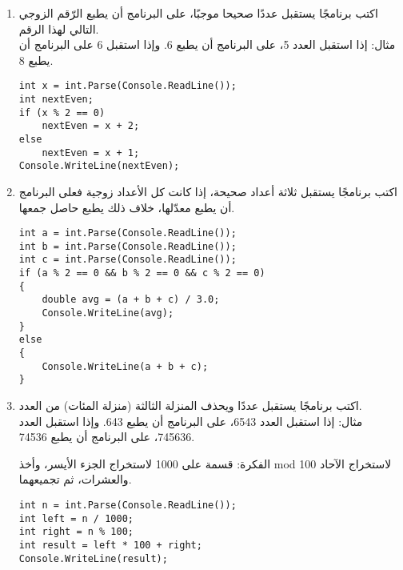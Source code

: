 \documentclass[12pt]{article}
\begin{document}
\begin{enumerate}[itemsep=2em]
\item
اكتب برنامجًا يستقبل عددًا صحيحا موجبًا، على البرنامج أن يطبع الرّقم الزوجي التالي لهذا الرقم.\\
مثال: إذا استقبل العدد 5، على البرنامج أن يطبع 6. وإذا استقبل 6 على البرنامج أن يطبع 8.

\ifwithsols
\begin{boxSolution}
\begin{english}
\begin{verbatim}
int x = int.Parse(Console.ReadLine());
int nextEven;
if (x % 2 == 0)
    nextEven = x + 2;
else
    nextEven = x + 1;
Console.WriteLine(nextEven);
\end{verbatim}
\end{english}
\end{boxSolution}
\fi


\item
اكتب برنامجًا يستقبل ثلاثة أعداد صحيحة، إذا كانت كل الأعداد زوجية فعلى البرنامج أن يطبع معدّلها، خلاف ذلك يطبع حاصل جمعها.

\ifwithsols
\begin{boxSolution}
\begin{english}
\begin{verbatim}
int a = int.Parse(Console.ReadLine());
int b = int.Parse(Console.ReadLine());
int c = int.Parse(Console.ReadLine());
if (a % 2 == 0 && b % 2 == 0 && c % 2 == 0)
{
    double avg = (a + b + c) / 3.0;
    Console.WriteLine(avg);
}
else
{
    Console.WriteLine(a + b + c);
}
\end{verbatim}
\end{english}
\end{boxSolution}
\fi


\item
اكتب برنامجًا يستقبل عددًا ويحذف المنزلة الثالثة (منزلة المئات) من العدد.\\
مثال: إذا استقبل العدد 6543، على البرنامج أن يطبع 643. وإذا استقبل العدد 745636، على البرنامج أن يطبع 74536.

\ifwithsols
\begin{boxSolution}
الفكرة: قسمة على 1000 لاستخراج الجزء الأيسر، وأخذ \textenglish{mod 100} لاستخراج الآحاد والعشرات، ثم تجميعهما.
\begin{english}
\begin{verbatim}
int n = int.Parse(Console.ReadLine());
int left = n / 1000;
int right = n % 100;
int result = left * 100 + right;
Console.WriteLine(result);
\end{verbatim}
\end{english}
\end{boxSolution}
\fi



\end{enumerate}
\end{document}

